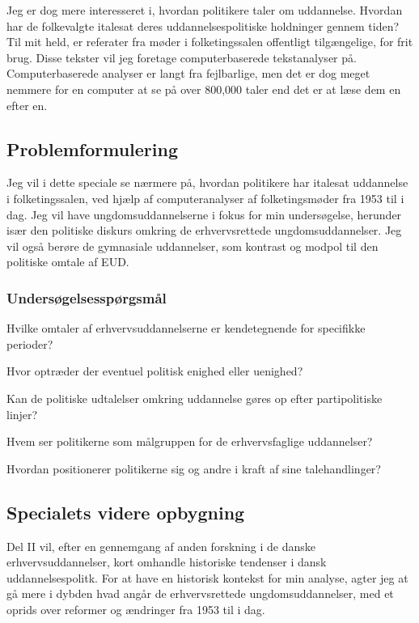 Jeg er dog mere interesseret i, hvordan politikere taler om uddannelse.
Hvordan har de folkevalgte italesat deres uddannelsespolitiske holdninger gennem tiden?
Til mit held, er referater fra møder i folketingssalen offentligt tilgængelige, for frit brug.
Disse tekster vil jeg foretage computerbaserede tekstanalyser på.
Computerbaserede analyser er langt fra fejlbarlige, men det er dog meget nemmere for en computer at se på over 800,000 taler end det er at læse dem en efter en.

\subsection{Problemformulering}\label{sec:pf}
Jeg vil i dette speciale se nærmere på, hvordan politikere har italesat uddannelse i folketingssalen, ved hjælp af computeranalyser af folketingsmøder fra 1953 til i dag.
Jeg vil have ungdomsuddannelserne i fokus for min undersøgelse, herunder især den politiske diskurs omkring de erhvervsrettede ungdomsuddannelser.
Jeg vil også berøre de gymnasiale uddannelser, som kontrast og modpol til den politiske omtale af EUD.

\subsubsection{Undersøgelsesspørgsmål}\label{sec:resqs}

Hvilke omtaler af erhvervsuddannelserne er kendetegnende for specifikke perioder?

Hvor optræder der eventuel politisk enighed eller uenighed?

Kan de politiske udtalelser omkring uddannelse gøres op efter partipolitiske linjer?

Hvem ser politikerne som målgruppen for de erhvervsfaglige uddannelser?

Hvordan positionerer politikerne sig og andre i kraft af sine talehandlinger?

\subsection{Specialets videre opbygning}\label{sec:structure}

Del II vil, efter en gennemgang af anden forskning i de danske erhvervsuddannelser, kort omhandle historiske tendenser i dansk uddannelsespolitk.
For at have en historisk kontekst for min analyse, agter jeg at gå mere i dybden hvad angår de erhvervsrettede ungdomsuddannelser, med et oprids over reformer og ændringer fra 1953 til i dag.

